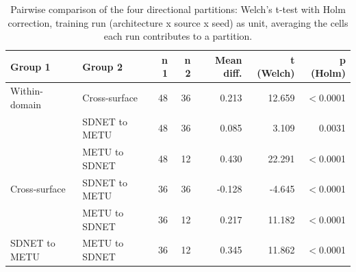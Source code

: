 \begin{table}[htbp]
\centering
\caption{Pairwise comparison of the four directional partitions: Welch's t-test with Holm correction, training run (architecture x source x seed) as unit, averaging the cells each run contributes to a partition.}
\label{tab:direccional-welch-corrida}
\begin{tabular}{llrrrrr}
\toprule
Group 1 & Group 2 & n 1 & n 2 & Mean diff. & t (Welch) & p (Holm) \\
\midrule
Within-domain & Cross-surface & 48 & 36 & 0.213 & 12.659 & $<$0.0001 \\
 & SDNET to METU & 48 & 36 & 0.085 & 3.109 & 0.0031 \\
 & METU to SDNET & 48 & 12 & 0.430 & 22.291 & $<$0.0001 \\
Cross-surface & SDNET to METU & 36 & 36 & -0.128 & -4.645 & $<$0.0001 \\
 & METU to SDNET & 36 & 12 & 0.217 & 11.182 & $<$0.0001 \\
SDNET to METU & METU to SDNET & 36 & 12 & 0.345 & 11.862 & $<$0.0001 \\
\bottomrule
\end{tabular}
\end{table}
